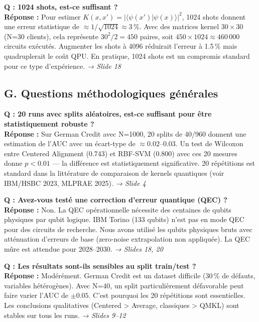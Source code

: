 \documentclass[12pt, a4paper]{article}
\begin{document}
\begin{question}
\textbf{Q : 1024 shots, est-ce suffisant ?}\\[4pt]
\textbf{Réponse :} Pour estimer $K(x, x') = |\langle\psi(x')|\psi(x)\rangle|^2$,
1024 shots donnent une erreur statistique de $\approx 1/\sqrt{1024} \approx 3\,\%$.
Avec des matrices kernel $30\times30$ (N=30 clients), cela représente
$30^2/2 = 450$ paires, soit $450 \times 1024 \approx 460\,000$ circuits exécutés.
Augmenter les shots à 4096 réduirait l'erreur à 1.5\,\% mais quadruplerait le coût QPU.
En pratique, 1024 shots est un compromis standard pour ce type d'expérience.
\hfill\textit{→ Slide 18}
\end{question}

\subsection*{G. Questions méthodologiques générales}

\begin{question}
\textbf{Q : 20 runs avec splits aléatoires, est-ce suffisant pour être statistiquement robuste ?}\\[4pt]
\textbf{Réponse :} Sur German Credit avec N=1000, 20 splits de 40/960 donnent
une estimation de l'AUC avec un écart-type de $\approx 0.02$--0.03.
Un test de Wilcoxon entre Centered Alignment (0.743) et RBF-SVM (0.800)
avec ces 20 mesures donne $p < 0.01$ — la différence est statistiquement significative.
20 répétitions est standard dans la littérature de comparaison de kernels quantiques
(voir IBM/HSBC 2023, MLPRAE 2025).
\hfill\textit{→ Slide 4}
\end{question}

\begin{question}
\textbf{Q : Avez-vous testé une correction d'erreur quantique (QEC) ?}\\[4pt]
\textbf{Réponse :} Non. La QEC opérationnelle nécessite des centaines de qubits physiques
par qubit logique. IBM Torino (133 qubits) n'est pas en mode QEC pour des circuits
de recherche. Nous avons utilisé les qubits physiques bruts avec atténuation d'erreurs
de base (zero-noise extrapolation non appliquée). La QEC mûre est attendue pour 2028--2030.
\hfill\textit{→ Slides 18, 20}
\end{question}

\begin{question}
\textbf{Q : Les résultats sont-ils sensibles au split train/test ?}\\[4pt]
\textbf{Réponse :} Modérément. German Credit est un dataset difficile (30\,\% de défauts,
variables hétérogènes). Avec N=40, un split particulièrement défavorable peut faire varier
l'AUC de $\pm 0.05$. C'est pourquoi les 20 répétitions sont essentielles.
Les conclusions qualitatives (Centered \textgreater{} Average, classiques \textgreater{} QMKL)
sont stables sur tous les runs.
\hfill\textit{→ Slides 9--12}
\end{question}
\end{document}
